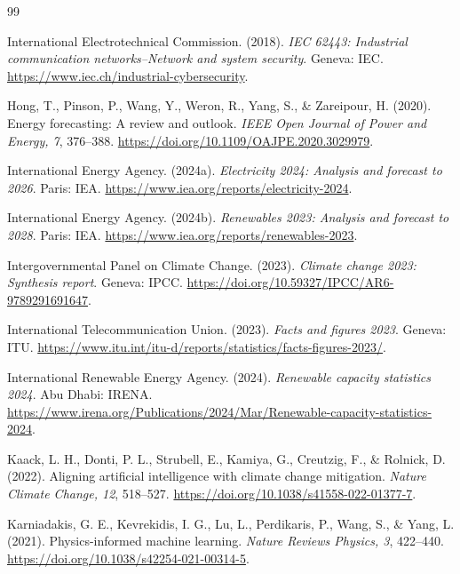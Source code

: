 \documentclass[12pt]{article}
\begin{document}
\clearpage
{}
\begin{thebibliography}{99}

International Electrotechnical Commission. (2018). \textit{IEC 62443: Industrial communication networks--Network and system security}. Geneva: IEC. \url{https://www.iec.ch/industrial-cybersecurity}.

Hong, T., Pinson, P., Wang, Y., Weron, R., Yang, S., \& Zareipour, H. (2020). Energy forecasting: A review and outlook. \textit{IEEE Open Journal of Power and Energy, 7}, 376--388. \url{https://doi.org/10.1109/OAJPE.2020.3029979}.

International Energy Agency. (2024a). \textit{Electricity 2024: Analysis and forecast to 2026}. Paris: IEA. \url{https://www.iea.org/reports/electricity-2024}.

International Energy Agency. (2024b). \textit{Renewables 2023: Analysis and forecast to 2028}. Paris: IEA. \url{https://www.iea.org/reports/renewables-2023}.

Intergovernmental Panel on Climate Change. (2023). \textit{Climate change 2023: Synthesis report}. Geneva: IPCC. \url{https://doi.org/10.59327/IPCC/AR6-9789291691647}.

International Telecommunication Union. (2023). \textit{Facts and figures 2023}. Geneva: ITU. \url{https://www.itu.int/itu-d/reports/statistics/facts-figures-2023/}.

International Renewable Energy Agency. (2024). \textit{Renewable capacity statistics 2024}. Abu Dhabi: IRENA. \url{https://www.irena.org/Publications/2024/Mar/Renewable-capacity-statistics-2024}.

Kaack, L. H., Donti, P. L., Strubell, E., Kamiya, G., Creutzig, F., \& Rolnick, D. (2022). Aligning artificial intelligence with climate change mitigation. \textit{Nature Climate Change, 12}, 518--527. \url{https://doi.org/10.1038/s41558-022-01377-7}.

Karniadakis, G. E., Kevrekidis, I. G., Lu, L., Perdikaris, P., Wang, S., \& Yang, L. (2021). Physics-informed machine learning. \textit{Nature Reviews Physics, 3}, 422--440. \url{https://doi.org/10.1038/s42254-021-00314-5}.


\end{thebibliography}
\end{document}

